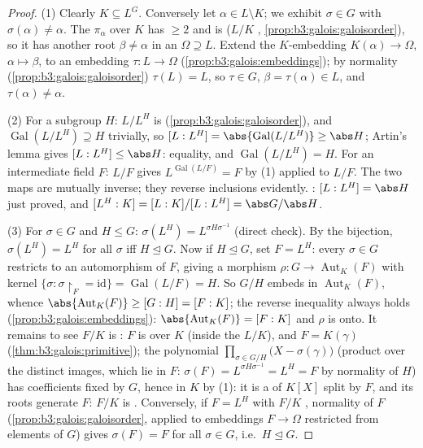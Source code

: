 \begin{proof}
(1) Clearly $K \subseteq L^G$. Conversely let $\alpha \in L
\setminus K$; we exhibit $\sigma \in G$ with $\sigma(\alpha) \ne
\alpha$. The  $\pi_\alpha$ over $K$ has 
$\geq 2$ and is  ($L/K$ ,
\cref{prop:b3:galois:galoisorder}), so it has another root
$\beta \neq \alpha$ in an  $\Omega \supseteq L$.
Extend the $K$-embedding $K(\alpha) \to \Omega$, $\alpha \mapsto
\beta$, to an embedding $\tau\colon L \to \Omega$
(\cref{prop:b3:galois:embeddings}); by normality
(\cref{prop:b3:galois:galoisorder}) $\tau(L) = L$, so $\tau \in
G$, $\beta = \tau(\alpha) \in L$, and $\tau(\alpha) \neq
\alpha$.

(2) For a subgroup $H$: $L/L^H$ is 
(\cref{prop:b3:galois:galoisorder}), and
$\operatorname{Gal}(L/L^H) \supseteq H$ trivially, so $[L:L^H] =
\abs{\operatorname{Gal}(L/L^H)} \geq \abs H$; Artin's lemma
gives $[L:L^H] \leq \abs H$: equality, and
$\operatorname{Gal}(L/L^H) = H$. For an intermediate field $F$:
$L/F$  gives $L^{\operatorname{Gal}(L/F)} = F$ by (1)
applied to $L/F$. The two maps are mutually inverse; they
reverse inclusions evidently. : $[L:L^H] = \abs H$ just
proved, and $[L^H:K] = [L:K]/[L:L^H] = \abs G/\abs H$.

(3) For $\sigma \in G$ and $H \leq G$: $\sigma(L^H) =
L^{\sigma H\sigma^{-1}}$ (direct check). By the bijection,
$\sigma(L^H) = L^H$ for all $\sigma$ iff $H \trianglelefteq G$.
Now if $H \trianglelefteq G$, set $F = L^H$: every $\sigma \in
G$ restricts to an automorphism of $F$, giving a morphism $\rho
\colon G \to \operatorname{Aut}_K(F)$ with kernel $\{\sigma :
\sigma\restriction_F = \mathrm{id}\} = \operatorname{Gal}(L/F) =
H$. So $G/H$ embeds in $\operatorname{Aut}_K(F)$, whence
$\abs{\operatorname{Aut}_K(F)} \geq [G:H] = [F:K]$; the reverse
inequality always holds (\cref{prop:b3:galois:embeddings}):
$\abs{\operatorname{Aut}_K(F)} = [F:K]$ and $\rho$ is onto. It
remains to see $F/K$ is : $F$ is  over $K$
(inside the  $L/K$), and $F = K(\gamma)$
(\cref{thm:b3:galois:primitive}); the polynomial
$\prod_{\sigma \in G/H}\bigl(X - \sigma(\gamma)\bigr)$ (product
over the distinct images, which lie in $F$: $\sigma(F) =
L^{\sigma H\sigma^{-1}} = L^H = F$ by normality of $H$) has
coefficients
fixed by $G$, hence in $K$ by (1): it is a 
of $K[X]$ split by $F$, and its roots generate $F$: $F/K$ is
. Conversely, if $F = L^H$ with $F/K$ , normality of
$F$ (\cref{prop:b3:galois:galoisorder}, applied to embeddings
$F \to \Omega$ restricted from elements of $G$) gives
$\sigma(F) = F$ for all $\sigma \in G$, i.e.\ $H
\trianglelefteq G$.
\end{proof}


